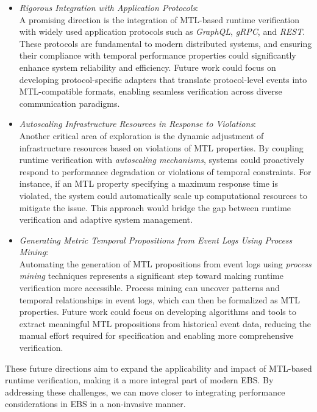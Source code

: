 \documentclass[twocolumn]{article}
\begin{document}
\begin{itemize}
	\item \emph{Rigorous Integration with Application Protocols}: \\
	      A promising direction is the integration of MTL-based runtime verification with widely used application protocols such as \emph{GraphQL}, \emph{gRPC}, and \emph{REST}. These protocols are fundamental to modern distributed systems, and ensuring their compliance with temporal performance properties could significantly enhance system reliability and efficiency. Future work could focus on developing protocol-specific adapters that translate protocol-level events into MTL-compatible formats, enabling seamless verification across diverse communication paradigms.

	\item \emph{Autoscaling Infrastructure Resources in Response to Violations}: \\
	      Another critical area of exploration is the dynamic adjustment of infrastructure resources based on violations of MTL properties. By coupling runtime verification with \emph{autoscaling mechanisms}, systems could proactively respond to performance degradation or violations of temporal constraints. For instance, if an MTL property specifying a maximum response time is violated, the system could automatically scale up computational resources to mitigate the issue. This approach would bridge the gap between runtime verification and adaptive system management.

	\item \emph{Generating Metric Temporal Propositions from Event Logs Using Process Mining}: \\
	      Automating the generation of MTL propositions from event logs using \emph{process mining} techniques represents a significant step toward making runtime verification more accessible. Process mining can uncover patterns and temporal relationships in event logs, which can then be formalized as MTL properties. Future work could focus on developing algorithms and tools to extract meaningful MTL propositions from historical event data, reducing the manual effort required for specification and enabling more comprehensive verification.
\end{itemize}

These future directions aim to expand the applicability and impact of MTL-based runtime verification, making it a more integral part of modern EBS. By addressing these challenges, we can move closer to integrating performance considerations in EBS in a non-invasive manner.





\end{document}
